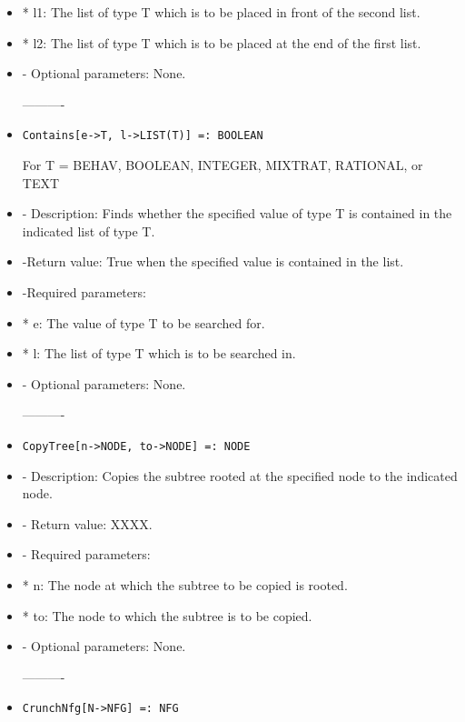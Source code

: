 \begin{itemize}
\bd
\item
*  l1:  The list of type T which is to be placed in front of the second list.
\item 
* l2:  The list of type T which is to be placed at the end of the first list.
\ed

\item
- Optional parameters:  None.
\ed

----------
\item
\begin{verbatim}
Contains[e->T, l->LIST(T)] =: BOOLEAN
\end{verbatim}

For T = BEHAV, BOOLEAN, INTEGER, MIXTRAT, RATIONAL, or TEXT

\bd
\item
- Description:  Finds whether the specified value of type T is
contained in the indicated list of type T.
\item 
-Return value:  True when the specified value is contained in the list.
\item
-Required parameters:
	
\bd
\item	
*  e:  The value of type T to be searched for.
\item
*  l:  The list of type T which is to be searched in.
\ed

\item
- Optional parameters:  None.
\ed

----------
\item

\begin{verbatim}
CopyTree[n->NODE, to->NODE] =: NODE
\end{verbatim}

\bd
\item
- Description:  Copies the subtree rooted at the specified node to the
indicated node.
\item
- Return value:  XXXX.
\item
- Required parameters:

\bd
\item	
*  n:  The node at which the subtree to be copied is rooted.
\item
*  to:  The node to which the subtree is to be copied.
\ed

\item
- Optional parameters:  None.
\ed

----------
\item
\begin{verbatim}
CrunchNfg[N->NFG] =: NFG
\end{verbatim}


\end{itemize}
